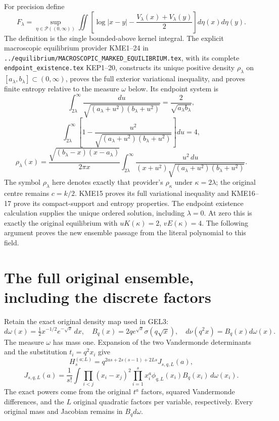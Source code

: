 For precision define
\[
 F_\lambda=\sup_{\eta\in\mathcal P((0,\infty))}
 \iint\left[\log|x-y|-\frac{V_\lambda(x)+V_\lambda(y)}2\right]
                         d\eta(x)d\eta(y).
 \tag{MFG12}
\]
The definition is the single bounded-above kernel integral. The explicit
macroscopic equilibrium provider KME1--24 in
\texttt{../equilibrium/MACROSCOPIC\_MARKED\_EQUILIBRIUM.tex}, with
its complete \texttt{endpoint\_existence.tex} KEP1--20, constructs
its unique positive density
$\rho_\lambda$ on $[a_\lambda,b_\lambda]\subset(0,\infty)$, proves
the full exterior variational inequality, and proves finite entropy
relative to the measure $\omega$ below. Its endpoint system is
\[
 \int_{2\lambda}^{\infty}
       \frac{du}{\sqrt{(a_\lambda+u^2)(b_\lambda+u^2)}}
       =\frac2{\sqrt{a_\lambda b_\lambda}},
\]
\[
 \int_{2\lambda}^{\infty}\left[1-
       \frac{u^2}{\sqrt{(a_\lambda+u^2)(b_\lambda+u^2)}}\right]du=4,
\]
\[
 \rho_\lambda(x)=\frac{\sqrt{(b_\lambda-x)(x-a_\lambda)}}{2\pi x}
 \int_{2\lambda}^{\infty}
       \frac{u^2\,du}{(x+u^2)
              \sqrt{(a_\lambda+u^2)(b_\lambda+u^2)}}.
 \tag{MFG13}
\]
The symbol $\rho_\lambda$ here denotes exactly that provider's
$\rho_\kappa$ under $\kappa=2\lambda$; the original centre remains
$c=k/2$. KME15 proves its full variational inequality and KME16--17
prove its compact-support and entropy properties.
The endpoint existence calculation supplies the unique ordered solution,
including $\lambda=0$. At zero this is exactly the original equilibrium
with $uK(\kappa)=2$, $vE(\kappa)=4$. The following argument proves the
new ensemble passage from the literal polynomial to this field.

\section{The full original ensemble, including the discrete factors}

Retain the exact original density map used in GEL3:
\[
 d\omega(x)=\tfrac12x^{-1/2}e^{-\sqrt x}\,dx,
 \quad B_q(x)=2qe^{\sqrt x}\sigma(q\sqrt x),
 \quad d\nu(q^2x)=B_q(x)d\omega(x).
\]
The measure $\omega$ has mass one. Expansion of the two Vandermonde
determinants and the substitution $t_i=q^2x_i$ give
\[
 \boxed{H_s^{(a;L)}
 =q^{2as+2s(s-1)+2Ls}J_{s,q,L}(a),}
\]
\[
 J_{s,q,L}(a)=\frac1{s!}\int
       \prod_{i<j}(x_i-x_j)^2
       \prod_{i=1}^s x_i^a\phi_{q,L}(x_i)B_q(x_i)\,d\omega(x_i).
 \tag{MFG14}
\]
The exact powers come from the original $t^a$ factors, squared
Vandermonde differences, and the $L$ original quadratic factors per
variable, respectively. Every original mass and Jacobian remains in
$B_qd\omega$.

